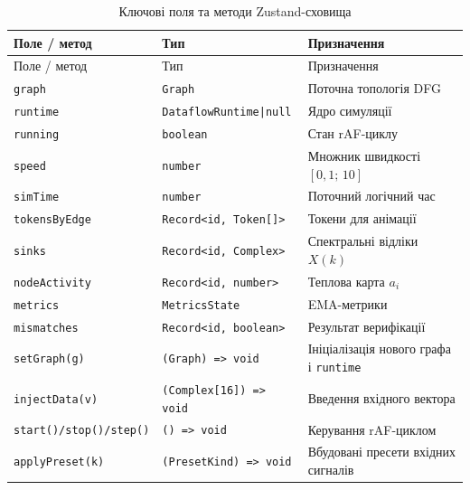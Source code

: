 \begin{longtable}[]{@{}
  >{\raggedright\arraybackslash}p{}
  >{\raggedright\arraybackslash}p{}
  >{\raggedright\arraybackslash}p{}@{}}
\caption[Ключові поля та методи Zustand-сховища]{Ключові поля та методи
Zustand-сховища}\tabularnewline
\toprule\noalign{}
\begin{minipage}[b]{\linewidth}\raggedright
Поле / метод
\end{minipage} & \begin{minipage}[b]{\linewidth}\raggedright
Тип
\end{minipage} & \begin{minipage}[b]{\linewidth}\raggedright
Призначення
\end{minipage} \\
\midrule\noalign{}
\endfirsthead
\toprule\noalign{}
\begin{minipage}[b]{\linewidth}\raggedright
Поле / метод
\end{minipage} & \begin{minipage}[b]{\linewidth}\raggedright
Тип
\end{minipage} & \begin{minipage}[b]{\linewidth}\raggedright
Призначення
\end{minipage} \\
\midrule\noalign{}
\endhead
\bottomrule\noalign{}
\endlastfoot
\texttt{graph} & \texttt{Graph} & Поточна топологія DFG \\
\texttt{runtime} & \texttt{DataflowRuntime|null} & Ядро симуляції \\
\texttt{running} & \texttt{boolean} & Стан rAF-циклу \\
\texttt{speed} & \texttt{number} & Множник швидкості \([0{,}1;\,10]\) \\
\texttt{simTime} & \texttt{number} & Поточний логічний час \\
\texttt{tokensByEdge} & \texttt{Record<id, Token[]>} & Токени для
анімації \\
\texttt{sinks} & \texttt{Record<id, Complex>} & Спектральні відліки
\(X(k)\) \\
\texttt{nodeActivity} & \texttt{Record<id, number>} & Теплова карта
\(a_i\) \\
\texttt{metrics} & \texttt{MetricsState} & EMA-метрики \\
\texttt{mismatches} & \texttt{Record<id, boolean>} & Результат
верифікації \\
\texttt{setGraph(g)} & \texttt{(Graph) => void} & Ініціалізація нового
графа і \texttt{runtime} \\
\texttt{injectData(v)} & \texttt{(Complex[16]) => void} & Введення
вхідного вектора \\
\texttt{start()/stop()/step()} & \texttt{() => void} & Керування
rAF-циклом \\
\texttt{applyPreset(k)} & \texttt{(PresetKind) => void} & Вбудовані
пресети вхідних сигналів \\
\end{longtable}

